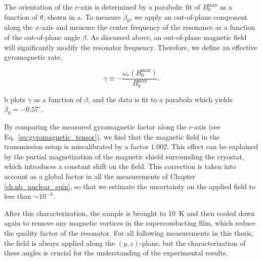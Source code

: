 The orientation of the $c$-axis is determined by a parabolic fit of $B_0^\text{max}$ as a function of $\theta$, shown in a. To measure $\beta_0$, we apply an out-of-plane component along the $x$-axis and measure the center frequency of the resonance as a function of the out-of-plane angle $\beta$. As discussed above, an out-of-plane magnetic field will significantly modify the resonator frequency. Therefore, we define an effective gyromagnetic rate,

\begin{equation}
    \gamma \equiv -\frac{\omega_r(B_0^\text{max})}{B_0^\text{max}}.
\end{equation}

b plots $\gamma$ as a function of $\beta$, and the data is fit to a parabola which yields $\beta_0=-0.57^\circ$. 

By comparing the measured gyromagnetic factor along the $c$-axis (see Eq.~\ref{eq:gyromagnetic_tensor}), we find that the magnetic field in the transmission setup is miscalibrated by a factor $1.002$. This effect can be explained by the partial magnetization of the magnetic shield surrounding the cryostat, which introduces a constant shift on the field. This correction is taken into account as a global factor in all the measurements of Chapter \ref{ch:nb_nuclear_spin}, so that we estimate the uncertainty on the applied field to less than $\sim 10^{-3}$.

After this characterization, the sample is brought to 10~K and then cooled down again to remove any magnetic vortices in the superconducting film, which reduce the quality factor of the resonator. For all following measurements in this thesis, the field is always applied along the $(y, z)$-plane, but the characterization of these angles is crucial for the understanding of the experimental results. 





